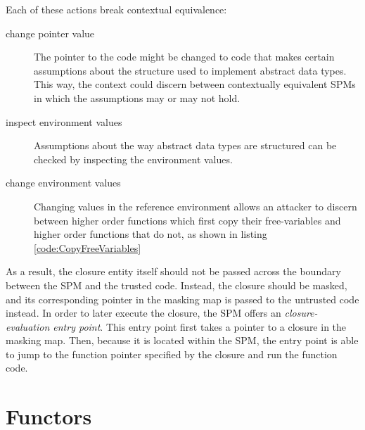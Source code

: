 \documentclass[10pt,a4paper]{report}
\begin{document}
Each of these actions break contextual equivalence:
\begin{description}
\item[change pointer value] The pointer to the code might be changed to code that makes certain assumptions about the structure used to implement abstract data types. This way, the context could discern between contextually equivalent SPMs in which the assumptions may or may not hold.
\item[inspect environment values]
Assumptions about the way abstract data types are structured can be checked by inspecting the environment values.
\item[change environment values] Changing values in the reference environment allows an attacker to discern between higher order functions which first copy their free-variables and higher order functions that do not, as shown in listing \ref{code:CopyFreeVariables}
\end{description}

As a result, the closure entity itself should not be passed across the boundary between the SPM and the trusted code. Instead, the closure should be masked, and its corresponding pointer in the masking map is passed to the untrusted code instead.
In order to later execute the closure, the SPM offers an \emph{closure-evaluation entry point}. This entry point first takes a pointer to a closure in the masking map. Then, because it is located within the SPM, the entry point is able to jump to the function pointer specified by the closure and run the function code.

\section{Functors\label{sec:Functors}}
\end{document}

